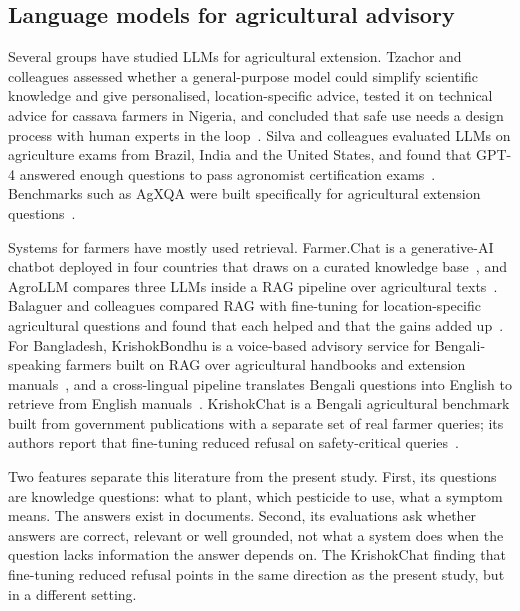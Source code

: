 \subsection{Language models for agricultural advisory}
\label{sec:rev-agri}

Several groups have studied LLMs for agricultural extension. Tzachor and colleagues assessed whether a general-purpose model could simplify scientific knowledge and give personalised, location-specific advice, tested it on technical advice for cassava farmers in Nigeria, and concluded that safe use needs a design process with human experts in the loop~\cite{tzachor2023large}. Silva and colleagues evaluated LLMs on agriculture exams from Brazil, India and the United States, and found that GPT-4 answered enough questions to pass agronomist certification exams~\cite{silva2023gpt4}. Benchmarks such as AgXQA were built specifically for agricultural extension questions~\cite{kpodo2024agxqa}.

Systems for farmers have mostly used retrieval. Farmer.Chat is a generative-AI chatbot deployed in four countries that draws on a curated knowledge base~\cite{singh2024farmerchat}, and AgroLLM compares three LLMs inside a RAG pipeline over agricultural texts~\cite{samuel2025agrollm}. Balaguer and colleagues compared RAG with fine-tuning for location-specific agricultural questions and found that each helped and that the gains added up~\cite{balaguer2024rag}. For Bangladesh, KrishokBondhu is a voice-based advisory service for Bengali-speaking farmers built on RAG over agricultural handbooks and extension manuals~\cite{krishokbondhu2025}, and a cross-lingual pipeline translates Bengali questions into English to retrieve from English manuals~\cite{hossain2026crosslingual}. KrishokChat is a Bengali agricultural benchmark built from government publications with a separate set of real farmer queries; its authors report that fine-tuning reduced refusal on safety-critical queries~\cite{krishokchat2026}.

Two features separate this literature from the present study. First, its questions are knowledge questions: what to plant, which pesticide to use, what a symptom means. The answers exist in documents. Second, its evaluations ask whether answers are correct, relevant or well grounded, not what a system does when the question lacks information the answer depends on. The KrishokChat finding that fine-tuning reduced refusal points in the same direction as the present study, but in a different setting.

